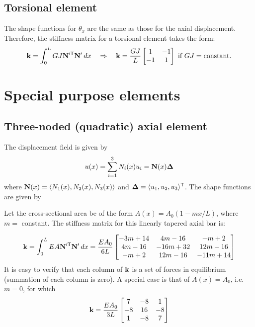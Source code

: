 \subsection{Torsional element}
The shape functions for $\theta_x$ are the same as those for the axial displacement. Therefore, the stiffness matrix for a torsional element takes the form:
\begin{equation}
  \mathbf{k} = \int_0^L GJ\mathbf{N}'^{\mathsf{T}}\mathbf{N}'\,dx \quad\Rightarrow\quad \mathbf{k} = \frac{GJ}{L}\begin{bmatrix}1 & -1\\ -1 & 1\end{bmatrix}\ \text{if } GJ = \text{constant.}
\end{equation}

\section{Special purpose elements}
\subsection{Three-noded (quadratic) axial element}
The displacement field is given by
\begin{equation}
  u(x) = \sum_{i=1}^3 N_i(x)u_i = \mathbf{N}(x)\bm{\Delta}
\end{equation}
where $\mathbf{N}(x) = \langle N_1(x), N_2(x), N_3(x)\rangle$ and $\bm{\Delta} = \langle u_1, u_2, u_3\rangle^{\mathsf{T}}$. The shape functions are given by
\begin{fig}
  
\end{fig}
Let the cross-sectional area be of the form $A(x) = A_0(1-mx/L)$, where $m =$ constant. The stiffness matrix for this linearly tapered axial bar is:
\begin{fig}
  
\end{fig}
\begin{equation}
  \mathbf{k} = \int_0^L EA\mathbf{N}'^{\mathsf{T}}\mathbf{N}'\,dx = \frac{EA_0}{6L}\begin{bmatrix}-3m+14 & 4m-16 & -m+2\\ 4m-16 & -16m+32 & 12m-16\\ -m+2 & 12m-16 & -11m+14\end{bmatrix}
\end{equation}
It is easy to verify that each column of $\mathbf{k}$ is a set of forces in equilibrium (summation of each column is zero). A special case is that of $A(x) = A_0$, i.e.\ $m = 0$, for which
\begin{equation}
  \mathbf{k} = \frac{EA_0}{3L}\begin{bmatrix}7 & -8 & 1\\ -8 & 16 & -8\\ 1 & -8 & 7\end{bmatrix}
\end{equation}

